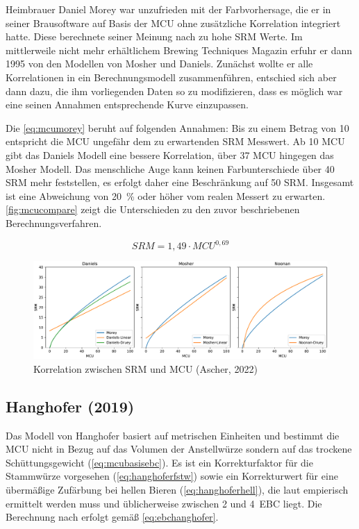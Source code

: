 \documentclass[a4paper,parskip=half]{scrartcl}
\newcommand{\MCUL}{\mathit{MCU}}
\newcommand{\SRM}{\mathit{SRM}}
\begin{document}
Heimbrauer Daniel Morey war unzufrieden mit der Farbvorhersage, die er in seiner Brausoftware auf Basis der MCU ohne zusätzliche Korrelation integriert hatte. Diese berechnete seiner Meinung nach zu hohe SRM Werte. Im mittlerweile nicht mehr erhältlichem Brewing Techniques Magazin erfuhr er dann 1995 von den Modellen von  Mosher und Daniels. Zunächst wollte er alle Korrelationen in ein Berechnungsmodell zusammenführen, entschied sich aber dann dazu, die ihm vorliegenden Daten so zu modifizieren, dass es möglich war eine seinen Annahmen entsprechende Kurve einzupassen. \parencite{Smith2010}

Die \autoref{eq:mcumorey} beruht auf folgenden Annahmen: Bis zu einem Betrag von 10 entspricht die MCU ungefähr dem zu erwartenden SRM Messwert. Ab 10 MCU gibt das Daniels Modell eine bessere Korrelation, über 37 MCU hingegen das Mosher Modell. Das menschliche Auge kann keinen Farbunterschiede über 40 SRM mehr feststellen, es erfolgt daher eine Beschränkung auf 50 SRM. Insgesamt ist eine Abweichung von 20~\% oder höher vom realen Messert zu erwarten. \autoref{fig:mcucompare} zeigt die Unterschieden zu den zuvor beschriebenen Berechnungsverfahren. \parencite{Morey2004}

\begin{equation}
\SRM = 1,49 \cdot \MCUL^{0,69}
\label{eq:mcumorey}
\end{equation}

\begin{figure}[h]
\centering
\includegraphics[width=14cm]{graph_srm.pdf}
\caption{Korrelation zwischen SRM und MCU (Ascher, 2022)}
\label{fig:mcucompare}
\end{figure}

\subsection*{Hanghofer (2019)}

Das Modell von Hanghofer basiert auf metrischen Einheiten und bestimmt die MCU nicht in Bezug auf das Volumen der Anstellwürze sondern auf das trockene Schüttungsgewicht (\autoref{eq:mcubasisebc}). Es ist ein Korrekturfaktor für die Stammwürze vorgesehen (\autoref{eq:hanghoferfstw}) sowie ein Korrekturwert für eine übermäßige Zufärbung bei hellen Bieren (\autoref{eq:hanghoferhell}), die laut \textcite{Krueger2019} empierisch ermittelt werden muss und üblicherweise zwischen 2 und 4~EBC liegt. Die Berechnung nach \textcite[78]{Hanghofer2019} erfolgt gemäß \autoref{eq:ebchanghofer}.
\end{document}
